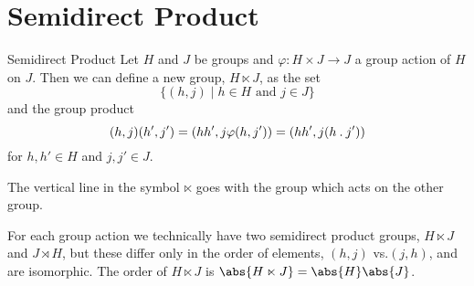 \section{Semidirect Product}
\begin{dfn}{Semidirect Product}{}
    Let \(H\) and \(J\) be groups and \(\varphi \colon H \times J \to J\) a group action of \(H\) on \(J\).
    Then we can define a new group, \(H \ltimes J\), as the set
    \begin{equation}
        \{(h, j) \mid h \in H \text{ and } j \in J\}
    \end{equation}
    and the group product
    \begin{equation}
        (h, j)(h', j') = (hh', j\varphi(h, j')) = (hh', j(h\mathbin{.} j'))
    \end{equation}
    for \(h, h' \in H\) and \(j, j' \in J\).
    \begin{rmk}
        The vertical line in the symbol \(\ltimes\) goes with the group which acts on the other group.
    \end{rmk}
\end{dfn}

For each group action we technically have two semidirect product groups, \(H \ltimes J\) and \(J \rtimes H\), but these differ only in the order of elements, \((h, j)\) vs.\@ \((j, h)\), and are isomorphic.
The order of \(H \ltimes J\) is \(\abs{H \ltimes J} = \abs{H}\abs{J}\).

